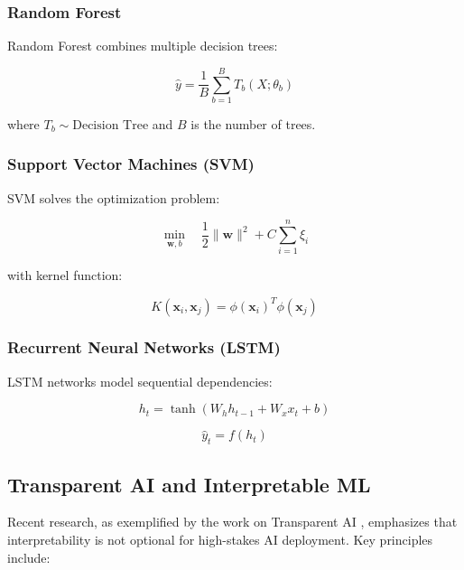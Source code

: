 \documentclass[11pt,a4paper]{article}
\begin{document}
\subsubsection{Random Forest}

Random Forest combines multiple decision trees:

\begin{equation}
\hat{y} = \frac{1}{B}\sum_{b=1}^B T_b(X; \theta_b)
\end{equation}

where $T_b \sim \text{Decision Tree}$ and $B$ is the number of trees.

\subsubsection{Support Vector Machines (SVM)}

SVM solves the optimization problem:

\begin{equation}
\min_{\mathbf{w},b} \quad \frac{1}{2}\|\mathbf{w}\|^2 + C\sum_{i=1}^n \xi_i
\end{equation}

with kernel function:

\begin{equation}
K(\mathbf{x}_i, \mathbf{x}_j) = \phi(\mathbf{x}_i)^T\phi(\mathbf{x}_j)
\end{equation}

\subsubsection{Recurrent Neural Networks (LSTM)}

LSTM networks model sequential dependencies:

\begin{equation}
h_t = \tanh(W_h h_{t-1} + W_x x_t + b)
\end{equation}

\begin{equation}
\hat{y}_t = f(h_t)
\end{equation}

\subsection{Transparent AI and Interpretable ML}

Recent research, as exemplified by the work on Transparent AI \cite{transparent_ai_2025}, emphasizes that interpretability is not optional for high-stakes AI deployment. Key principles include:
\end{document}
